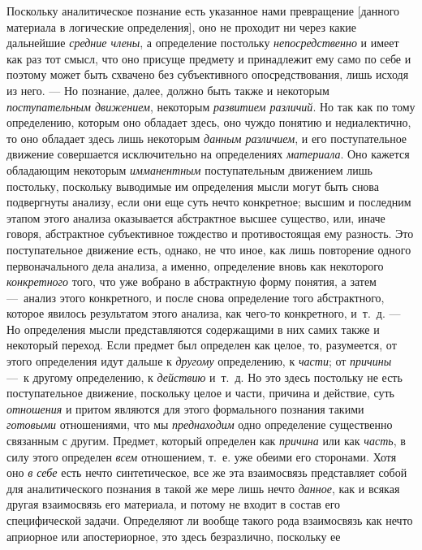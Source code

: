 \documentclass[twoside]{article}
\begin{document}
{Поскольку аналитическое познание есть указанное нами
превращение [данного материала в логические определения], оно не проходит
ни через какие дальнейшие {\em средние
члены}, а определение постольку
{\em непосредственно} и
имеет как раз тот смысл, что оно присуще предмету и принадлежит ему само по
себе и поэтому может быть схвачено без субъективного опосредствования, лишь
исходя из него. — Но познание, далее, должно быть также и
некоторым {\em поступательным
движением}, некоторым
{\em развитием различий}.
Но так как по тому определению, которым оно обладает здесь,
оно чуждо понятию и недиалектично, то оно обладает здесь лишь некоторым
{\em данным различием}, и
его поступательное движение совершается исключительно на определениях
{\em материала}. Оно
кажется обладающим некоторым
{\em имманентным}
поступательным движением лишь постольку, поскольку выводимые
им определения мысли могут быть снова подвергнуты анализу, если они еще
суть нечто конкретное; высшим и последним этапом этого анализа оказывается
абстрактное высшее существо, или, иначе говоря, абстрактное субъективное
тождество и противостоящая ему разность. Это поступательное движение есть,
однако, не что иное, как лишь повторение одного первоначального дела
анализа, а именно, определение вновь как некоторого
{\em конкретного} того,
что уже вобрано в абстрактную форму понятия, а затем
—~анализ этого конкретного, и после снова определение того
абстрактного, которое явилось результатом этого анализа, как чего-то
конкретного, и~т.~д. — Но определения мысли
представляются содержащими в них самих также и некоторый
переход. Если предмет был определен как целое, то, разумеется, от этого
определения идут дальше к {\em другому}
определению, к
{\em части}; от
{\em причины} —~к другому
определению, к {\em действию}
и~т.~д. Но это здесь постольку не есть поступательное
движение, поскольку целое и части, причина и действие, суть
{\em отношения} и притом
являются для этого формального познания такими
{\em готовыми}
отношениями, что мы
{\em преднаходим} одно
определение существенно связанным с другим. Предмет, который определен как
{\em причина} или как
{\em часть}, в силу этого
определен {\em всем}
отношением, т.~е. уже обеими его сторонами. Хотя оно
{\em в себе} есть нечто
синтетическое, все же эта взаимосвязь представляет собой для аналитического
познания в такой же мере лишь нечто
{\em данное}, как и
всякая другая взаимосвязь его материала, и потому не входит в состав его
специфической задачи. Определяют ли вообще такого рода взаимосвязь как
нечто априорное или апостериорное, это здесь безразлично, поскольку ее
}
\end{document}
